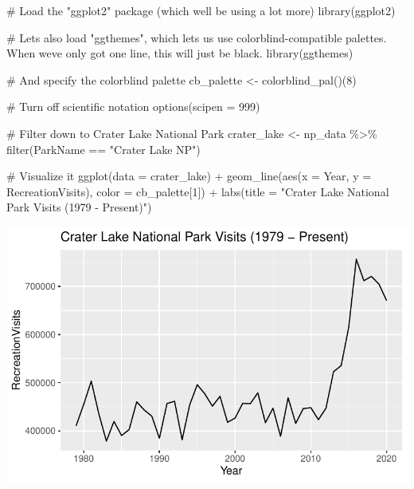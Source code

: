\documentclass[
  letterpaper,
  DIV=11,
  numbers=noendperiod]{scrartcl}
\newenvironment{Shaded}{\begin{snugshade}}{\end{snugshade}}
\newcommand{\AttributeTok}[1]{\textcolor[rgb]{0.40,0.45,0.13}{#1}}
\newcommand{\CommentTok}[1]{\textcolor[rgb]{0.37,0.37,0.37}{#1}}
\newcommand{\DecValTok}[1]{\textcolor[rgb]{0.68,0.00,0.00}{#1}}
\newcommand{\FunctionTok}[1]{\textcolor[rgb]{0.28,0.35,0.67}{#1}}
\newcommand{\NormalTok}[1]{\textcolor[rgb]{0.00,0.23,0.31}{#1}}
\newcommand{\OtherTok}[1]{\textcolor[rgb]{0.00,0.23,0.31}{#1}}
\newcommand{\SpecialCharTok}[1]{\textcolor[rgb]{0.37,0.37,0.37}{#1}}
\newcommand{\StringTok}[1]{\textcolor[rgb]{0.13,0.47,0.30}{#1}}
\begin{document}
\begin{Shaded}
\begin{Highlighting}[]
\CommentTok{\# Load the "ggplot2" package (which we\textquotesingle{}ll be using a lot more)}
\FunctionTok{library}\NormalTok{(ggplot2)}

\CommentTok{\# Let\textquotesingle{}s also load "ggthemes", which let\textquotesingle{}s us use colorblind{-}compatible palettes. When we\textquotesingle{}ve only got one line, this will just be black.}
\FunctionTok{library}\NormalTok{(ggthemes)}

\CommentTok{\# And specify the colorblind palette}
\NormalTok{cb\_palette }\OtherTok{\textless{}{-}} \FunctionTok{colorblind\_pal}\NormalTok{()(}\DecValTok{8}\NormalTok{)}

\CommentTok{\# Turn off scientific notation}
\FunctionTok{options}\NormalTok{(}\AttributeTok{scipen =} \DecValTok{999}\NormalTok{)}

\CommentTok{\# Filter down to Crater Lake National Park}
\NormalTok{crater\_lake }\OtherTok{\textless{}{-}}\NormalTok{ np\_data }\SpecialCharTok{\%\textgreater{}\%} \FunctionTok{filter}\NormalTok{(ParkName }\SpecialCharTok{==} \StringTok{"Crater Lake NP"}\NormalTok{)}

\CommentTok{\# Visualize it}
\FunctionTok{ggplot}\NormalTok{(}\AttributeTok{data =}\NormalTok{ crater\_lake) }\SpecialCharTok{+} 
  \FunctionTok{geom\_line}\NormalTok{(}\FunctionTok{aes}\NormalTok{(}\AttributeTok{x =} 
\NormalTok{  Year, }\AttributeTok{y =}\NormalTok{ RecreationVisits), }
  \AttributeTok{color =}\NormalTok{ cb\_palette[}\DecValTok{1}\NormalTok{]) }\SpecialCharTok{+}
  \FunctionTok{labs}\NormalTok{(}\AttributeTok{title =} \StringTok{"Crater Lake National Park Visits (1979 {-} Present)"}\NormalTok{)}
\end{Highlighting}
\end{Shaded}

\includegraphics{index_files/figure-pdf/unnamed-chunk-3-1.pdf}
\end{document}
